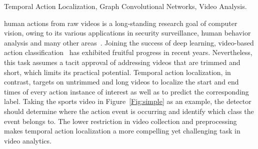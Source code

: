 \documentclass[10pt,journal,compsoc]{IEEEtran}
\begin{document}
{\begin{abstract}
		\end{abstract}
		
		\begin{IEEEkeywords}
			Temporal Action Localization, Graph Convolutional Networks, Video Analysis.
	\end{IEEEkeywords}}
	
	
	\maketitle
	
	
	\IEEEdisplaynontitleabstractindextext
	\IEEEpeerreviewmaketitle
	
	 human actions from raw videos is a long-standing research goal of computer vision, owing to its various applications in security surveillance, human behavior analysis and many other areas~\cite{simonyan2014two,tran2015learning,fan2018end,wang2016temporal}. Joining the success of deep learning, video-based action classification~\cite{wang2016temporal,carreira2017quo,tran2015learning} has exhibited fruitful progress in recent years. Nevertheless, this task assumes a tacit approval of addressing videos that are trimmed and short, which limits its practical potential. Temporal action localization, in contrast, targets on untrimmed and long videos to localize the start and end times of every action instance of interest as well as to predict the corresponding label. Taking the sports video in Figure~\ref{Fig:simple} as an example, the detector should determine where the action event is occurring and identify which class the event belongs to. The lower restriction in video collection and preprocessing makes temporal action localization a more compelling yet challenging task in video analytics. 
	
\end{document}
